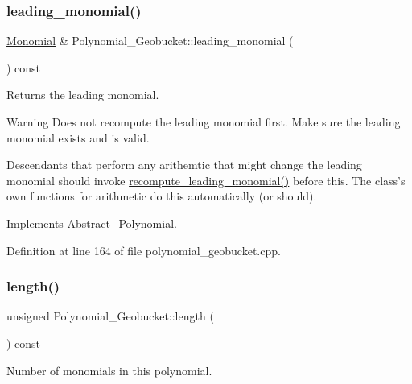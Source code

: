 \subsubsection{\texorpdfstring{leading\+\_\+monomial()}{leading\_monomial()}}
{\footnotesize\ttfamily \hyperlink{class_monomial}{Monomial} \& Polynomial\+\_\+\+Geobucket\+::leading\+\_\+monomial (\begin{DoxyParamCaption}{ }\end{DoxyParamCaption}) const\hspace{0.3cm}{\ttfamily [virtual]}}



Returns the leading monomial. 

\begin{DoxyWarning}{Warning}
Does not recompute the leading monomial first. Make sure the leading monomial exists and is valid.

Descendants that perform any arithemtic that might change the leading monomial should invoke \hyperlink{class_polynomial___geobucket_ab57dbe8d5f0d3860997775d9f354ab0c}{recompute\+\_\+leading\+\_\+monomial()} before this. The class's own functions for arithmetic do this automatically (or should). 
\end{DoxyWarning}


Implements \hyperlink{class_abstract___polynomial_a9186ed0f55c5cc4ecb1b9bc11ba9f679}{Abstract\+\_\+\+Polynomial}.



Definition at line 164 of file polynomial\+\_\+geobucket.\+cpp.

\mbox{\label{class_polynomial___geobucket_a42b1c165e65da192cdbed556239c7c29}} 
\subsubsection{\texorpdfstring{length()}{length()}}
{\footnotesize\ttfamily unsigned Polynomial\+\_\+\+Geobucket\+::length (\begin{DoxyParamCaption}{ }\end{DoxyParamCaption}) const\hspace{0.3cm}{\ttfamily [virtual]}}



Number of monomials in this polynomial. 

